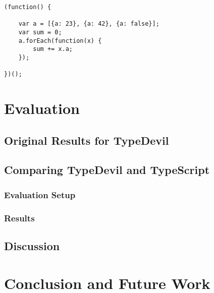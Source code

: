 \documentclass[runningheads,a4paper]{llncs}
\begin{document}
\medskip\medskip
\lstset{language=javascript}
\begin{minipage}{\linewidth}
\begin{lstlisting}[frame=single, caption=inconsistent\_foreach.js]
(function() {
    
    var a = [{a: 23}, {a: 42}, {a: false}];
    var sum = 0;
    a.forEach(function(x) {
        sum += x.a;
    });
    
})();
\end{lstlisting}
\end{minipage}




\section{Evaluation}

\subsection{Original Results for TypeDevil}

\subsection{Comparing TypeDevil and TypeScript} \label{comparison}

\subsubsection{Evaluation Setup}

\subsubsection{Results}


\subsection{Discussion}



\section{Conclusion and Future Work}


{}

\end{document}
